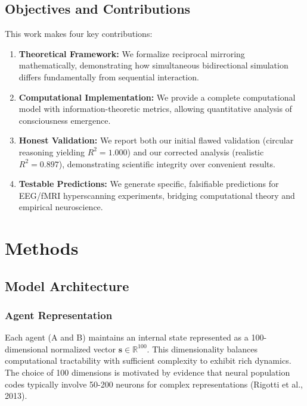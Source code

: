 \documentclass[12pt]{article}
\begin{document}
\subsection{Objectives and Contributions}

This work makes four key contributions:

\begin{enumerate}
\item \textbf{Theoretical Framework:} We formalize reciprocal mirroring mathematically, demonstrating how simultaneous bidirectional simulation differs fundamentally from sequential interaction.

\item \textbf{Computational Implementation:} We provide a complete computational model with information-theoretic metrics, allowing quantitative analysis of consciousness emergence.

\item \textbf{Honest Validation:} We report both our initial flawed validation (circular reasoning yielding $R^2=1.000$) and our corrected analysis (realistic $R^2=0.897$), demonstrating scientific integrity over convenient results.

\item \textbf{Testable Predictions:} We generate specific, falsifiable predictions for EEG/fMRI hyperscanning experiments, bridging computational theory and empirical neuroscience.
\end{enumerate}

\section{Methods}

\subsection{Model Architecture}

\subsubsection{Agent Representation}

Each agent (A and B) maintains an internal state represented as a 100-dimensional normalized vector $\mathbf{s} \in \mathbb{R}^{100}$. This dimensionality balances computational tractability with sufficient complexity to exhibit rich dynamics. The choice of 100 dimensions is motivated by evidence that neural population codes typically involve 50-200 neurons for complex representations (Rigotti et al., 2013).
\end{document}
